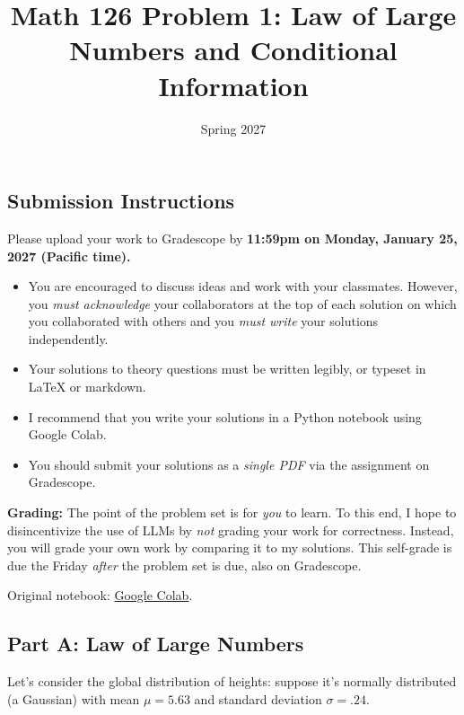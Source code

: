 \documentclass{article}
\title{Math 126 Problem 1: Law of Large Numbers and Conditional Information}
\author{} %
\date{Spring 2027}
\begin{document}
\maketitle

\hypertarget{submission-instructions}{%
\subsection*{Submission Instructions}\label{submission-instructions}}

Please upload your work to Gradescope by \textbf{11:59pm on Monday, January 25, 2027 (Pacific time).}

\begin{itemize}
\item
  You are encouraged to discuss ideas and work with your classmates. However, you \emph{must acknowledge} your collaborators at the top of each solution on which you collaborated with others and you \emph{must write} your solutions independently.
\item
  Your solutions to theory questions must be written legibly, or typeset in LaTeX or markdown.
\item
  I recommend that you write your solutions in a Python notebook using Google Colab.
\item
  You should submit your solutions as a \emph{single PDF} via the assignment on Gradescope.
\end{itemize}

\textbf{Grading:} The point of the problem set is for \emph{you} to learn. To this end, I hope to disincentivize the use of LLMs by \emph{not} grading your work for correctness. Instead, you will grade your own work by comparing it to my solutions. This self-grade is due the Friday \emph{after} the problem set is due, also on Gradescope.

\noindent Original notebook: \href{https://colab.research.google.com/drive/1dVCKdYtpymvJlFcipDiUd813Liet0uWv?usp=sharing}{Google Colab}.

\hypertarget{part-a-law-of-large-numbers}{%
\subsection*{Part A: Law of Large Numbers}\label{part-a-law-of-large-numbers}}

Let's consider the global distribution of heights: suppose it's normally distributed (a Gaussian) with mean \(\mu=5.63\) and standard deviation \(\sigma=.24\).
\end{document}
